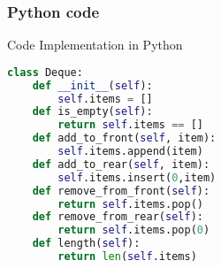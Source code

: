 \documentclass{beamer}
\begin{document}
\begin{frame}[fragile]
\frametitle{Python code}

Code Implementation in Python
\begin{lstlisting}[language=Python]
class Deque:
	def __init__(self):
		self.items = []
	def is_empty(self):
		return self.items == []
	def add_to_front(self, item):
		self.items.append(item)
	def add_to_rear(self, item):
		self.items.insert(0,item)
	def remove_from_front(self):
		return self.items.pop()
	def remove_from_rear(self):
		return self.items.pop(0)
	def length(self):
		return len(self.items)
\end{lstlisting}

\end{frame}
\end{document}
